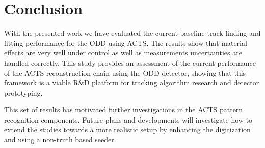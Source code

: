\documentclass[10pt, paper=a4, UKenglish]{article}
\def\Acknowledgements{\bigskip  \bigskip \begin{center} \begin{large}
      \bf ACKNOWLEDGEMENTS \end{large}\end{center}}
\begin{document}

\section{Conclusion}

With the presented work we have evaluated the current baseline track finding and fitting performance for the ODD using ACTS. The results show that material effects are very well under control as well as measurements uncertainties are handled correctly. This study provides an assessment of the current performance of the ACTS reconstruction chain using the ODD detector, showing that this framework is a viable R\&D platform for tracking algorithm research and detector prototyping.

This set of results has motivated further investigations in the ACTS pattern recognition components. Future plans and developments will investigate how to extend the studies towards a more realistic setup by enhancing the digitization and using a non-truth based seeder.




\printbibliography




\end{document}
